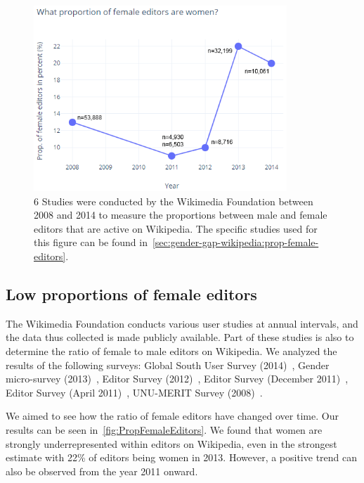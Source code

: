 \documentclass[a4paper, 11pt]{article}
\begin{document}
\begin{figure}[t]
	\centering
	\includegraphics[width=0.85\textwidth]{figures/PropFemaleEditors.png}
\caption{6 Studies were conducted by the Wikimedia Foundation between 2008 and 2014 to measure the proportions between male and female editors that are active on Wikipedia. The specific studies used for this figure can be found in~\autoref{sec:gender-gap-wikipedia:prop-female-editors}.} \label{fig:PropFemaleEditors}
\end{figure}

\subsection{Low proportions of female editors} \label{sec:gender-gap-wikipedia:prop-female-editors}
The Wikimedia Foundation conducts various user studies at annual intervals, and the data thus collected is made publicly available. Part of these studies is also to determine the ratio of female to male editors on Wikipedia. We analyzed the results of the following surveys: Global South User Survey (2014)~\cite{shammaa2014}, Gender micro-survey (2013)~\cite{fung2013}, Editor Survey (2012)~\cite{tilman2012}, Editor Survey (December 2011)~\cite{pande2011}, Editor Survey (April 2011)~\cite{khanna2011}, UNU-MERIT Survey (2008)~\cite{glott2010wikipedia}.

We aimed to see how the ratio of female editors have changed over time. Our results can be seen in~\autoref{fig:PropFemaleEditors}. We found that women are strongly underrepresented within editors on Wikipedia, even in the strongest estimate with 22\% of editors being women in 2013. However, a positive trend can also be observed from the year 2011 onward.
\end{document}
